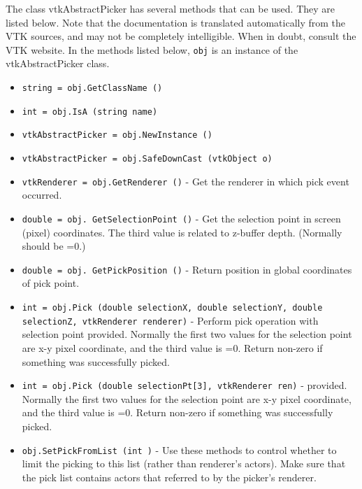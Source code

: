 The class vtkAbstractPicker has several methods that can be used.
  They are listed below.
Note that the documentation is translated automatically from the VTK sources,
and may not be completely intelligible.  When in doubt, consult the VTK website.
In the methods listed below, \verb|obj| is an instance of the vtkAbstractPicker class.
\begin{itemize}
\item  \verb|string = obj.GetClassName ()|

\item  \verb|int = obj.IsA (string name)|

\item  \verb|vtkAbstractPicker = obj.NewInstance ()|

\item  \verb|vtkAbstractPicker = obj.SafeDownCast (vtkObject o)|

\item  \verb|vtkRenderer = obj.GetRenderer ()| -  Get the renderer in which pick event occurred.

\item  \verb|double = obj. GetSelectionPoint ()| -  Get the selection point in screen (pixel) coordinates. The third
 value is related to z-buffer depth. (Normally should be =0.)

\item  \verb|double = obj. GetPickPosition ()| -  Return position in global coordinates of pick point.

\item  \verb|int = obj.Pick (double selectionX, double selectionY, double selectionZ, vtkRenderer renderer)| -  Perform pick operation with selection point provided. Normally the 
 first two values for the selection point are x-y pixel coordinate, and
 the third value is =0. Return non-zero if something was successfully 
 picked.

\item  \verb|int = obj.Pick (double selectionPt[3], vtkRenderer ren)| -  provided. Normally the first two values for the selection point
 are x-y pixel coordinate, and the third value is =0. Return
 non-zero if something was successfully picked.

\item  \verb|obj.SetPickFromList (int )| -  Use these methods to control whether to limit the picking to this list
 (rather than renderer's actors). Make sure that the pick list contains 
 actors that referred to by the picker's renderer.


\end{itemize}
